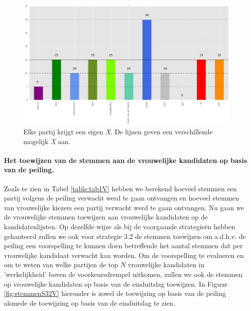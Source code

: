 \begin{figure}[H]

	\includegraphics[width=\linewidth]{eigenX_partijen.png}

			\caption{Elke partij krijgt een eigen \textit{X}. De lijnen geven een verschillende mogelijk \textit{X} aan.}

\label{fig:XV}
\end{figure}

\paragraph{Het toewijzen van de stemmen aan de vrouwelijke kandidaten op basis van de peiling.}
Zoals te zien in Tabel \ref{table:tab1V} hebben we berekend hoeveel stemmen een partij volgens de peiling verwacht werd te gaan ontvangen en hoeveel stemmen van vrouwelijke kiezers een partij verwacht werd te gaan ontvangen. Nu gaan we de vrouwelijke stemmen toewijzen aan vrouwelijke kandidaten op de kandidatenlijsten. Op dezelfde wijze als bij de voorgaande strategie\"{e}n hebben gehanteerd zullen we ook voor strategie 3.2 de stemmen toewijzen om a.d.h.v. de peiling een  voorspelling te kunnen doen betreffende het aantal stemmen dat per vrouwelijke kandidaat verwacht kan worden. Om de voorspelling te evalueren en om te weten van welke partijen de top \textit{N} vrouwelijke kandidaten in 'werkelijkheid' boven de voorkeursdrempel uitkomen, zullen we ook de stemmen op vrouwelijke kandidaten op basis van de einduitslag toewijzen. In Figuur \ref{fig:stemmenS32V}  hieronder is zowel de toewijzing op basis van de peiling alsmede de toewijzing op basis van de einduitslag te zien.  




